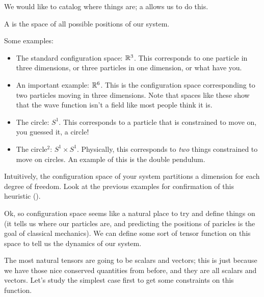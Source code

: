 \documentclass[11pt]{article}
\begin{document}
We would like to catalog where things are; a 
allows us to do this.

\begin{ddefinition}
    A  is the space of all possible positions
    of our system.
\end{ddefinition}

\begin{eexample}
    Some examples:
    \begin{itemize}
        \item The standard configuration space: $\mathbb{R}^3$. This corresponds
        to one particle in three dimensions, or three particles in one dimension,
        or what have you.
        \item An important example: $\mathbb{R}^6$. This is the configuration
        space corresponding to two particles moving in three dimensions.
        Note that spaces like these show that the wave function isn't 
        a field like most people think it is.
        \item The circle: $S^1$. This corresponds to a particle that
        is constrained to move on, you guessed it, a circle!
        \item The circle$^2$: $S^1 \times S^1$. Physically, this corresponds
        to \emph{two} things constrained to move on circles. An example of this
        is the double pendulum.
    \end{itemize}
\end{eexample}

\begin{reemark}
    Intuitively, the configuration space of your system partitions
    a dimension for each degree of freedom. Look at the previous examples
    for confirmation of this heuristic ().
\end{reemark}

Ok, so configuration space seems like a natural place to try and
define things on (it tells us where our particles are, and predicting
the positions of paricles is the goal of classical mechanics). We can
define some sort of tensor function on this space to tell us the dynamics
of our system. 

The most natural tensors are going to be scalars and vectors;
this is just because we have those nice conserved quantities
from before, and they are all scalars and vectors. Let's study
the simplest case first to get some constraints on this function.
\end{document}
